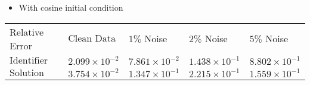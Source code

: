 \documentclass[12pt]{article}
\begin{document}
\begin{itemize}
    \item With cosine initial condition 
\end{itemize}
	\tabulinesep=4mm
	{ \large  }
	\vspace{3mm}
	\begin{tabu} to \linewidth { | X[c] | X[c] | X[c] | X[c] | X[c] | }
		 \hline
		\everyrow{\hline}
		Relative Error	& $\text{Clean Data}$ & $1 \%$ Noise & $2 \%$ Noise & $5 \%$ Noise \\
		$\text{Identifier}$ & $2.099 \times 10^{-2}$  & $7.861 \times 10^{-2}$   & $1.438 \times 10^{-1}$  & $8.802 \times 10^{-1}$ \\
		$\text{Solution}$ & $3.754 \times 10^{-2}$ &  $1.347 \times 10^{-1}$ & $2.215 \times 10^{-1}$    &  $1.559 \times 10^{-1}$  \\
	\end{tabu}
\end{document}
